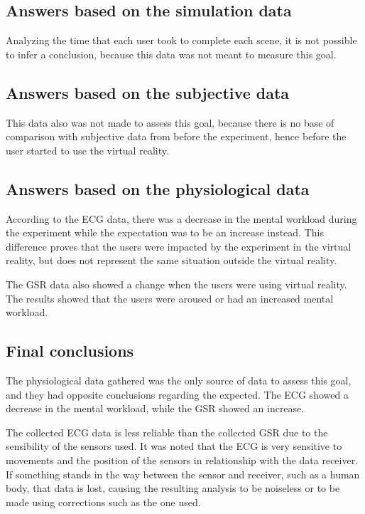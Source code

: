 \subsection{Answers based on the simulation data}

Analyzing the time that each user took to complete each scene, it is not possible to infer a conclusion, because this data was not meant to measure this goal.

\subsection{Answers based on the subjective data}

This data also was not made to assess this goal, because there is no base of comparison with subjective data from before the experiment, hence before the user started to use the virtual reality.

\subsection{Answers based on the physiological data}

According to the ECG data, there was a decrease in the mental workload during the experiment while the expectation was to be an increase instead. This difference proves that the users were impacted by the experiment in the virtual reality, but does not represent the same situation outside the virtual reality.

The GSR data also showed a change when the users were using virtual reality. The results showed that the users were aroused or had an increased mental workload.

\subsection{Final conclusions}

The physiological data gathered was the only source of data to assess this goal, and they had opposite conclusions regarding the expected. The ECG showed a decrease in the mental workload, while the GSR showed an increase.

The collected ECG data is less reliable than the collected GSR due to the sensibility of the sensors used. It was noted that the ECG is very sensitive to movements and the position of the sensors in relationship with the data receiver. If something stands in the way between the sensor and receiver, such as a human body, that data is lost, causing the resulting analysis to be noiseless or to be made using corrections such as the one used.

